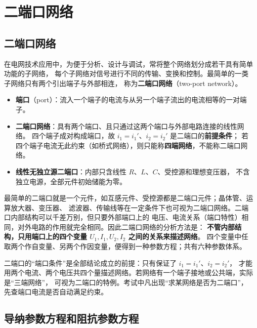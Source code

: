 \chapter{二端口网络}

\section{二端口网络}

在电网技术应用中，为便于分析、设计与调试，常将整个网络划分成若干具有简单功能的子网络，
每个子网络对信号进行不同的传输、变换和控制。最简单的一类子网络只有两个引出端子与外部相连，
称为\textbf{二端口网络}（two-port network）。

\begin{itemize}
  \item \textbf{端口}（port）：流入一个端子的电流与从另一个端子流出的电流相等的一对端子。
  \item \textbf{二端口网络}：具有两个端口、且只通过这两个端口与外部电路连接的线性网络。
        四个端子成对构成端口，故 $i_1=i_1'$、$i_2=i_2'$ 是二端口的\textbf{前提条件}；
        若四个端子电流无此约束（如桥式网络），则只能称\textbf{四端网络}，不能称二端口网络。
  \item \textbf{线性无独立源二端口}：内部只含线性 $R$、$L$、$C$、受控源和理想变压器，
        不含独立电源，全部元件初始储能为零。
\end{itemize}

最简单的二端口就是一个元件，如互感元件、受控源都是二端口元件；晶体管、运算放大器、变压器、
滤波器、传输线等在一定条件下也可视为二端口网络。二端口内部结构可以千差万别，但只要外部端口上的
电压、电流关系（端口特性）相同，对外电路的作用就完全相同。因此二端口网络的分析方法是：
\textbf{不管内部结构，只用端口上的四个变量 $U_1,I_1,U_2,I_2$ 之间的关系来描述网络}。
四个变量中任取两个作自变量、另两个作因变量，便得到一种参数方程；共有六种参数体系。

\begin{corepoint}{二端口的“端口条件”是全部结论成立的前提：只有保证了 $i_1=i_1'$、$i_2=i_2'$，
才能用两个电流、两个电压共四个量描述网络。若网络有一个端子接地或公共端，实际是“三端网络”，
可视为二端口的特例。考试中凡出现“求某网络是否为二端口”，先查端口电流是否自动满足约束。}
\end{corepoint}

\section{导纳参数方程和阻抗参数方程}

